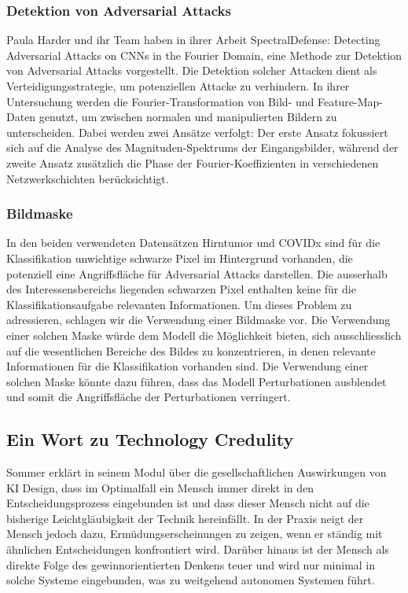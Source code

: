 \subsubsection{Detektion von Adversarial Attacks}
Paula Harder und ihr Team haben in ihrer Arbeit SpectralDefense: Detecting Adversarial Attacks on CNNs in the Fourier Domain, \cite{harder_spectraldefense_2021} eine  Methode zur Detektion von Adversarial Attacks vorgestellt. Die Detektion solcher Attacken dient als Verteidigungsstrategie, um potenziellen Attacke zu verhindern. In ihrer Untersuchung werden die Fourier-Transformation von Bild- und Feature-Map-Daten genutzt, um zwischen normalen und manipulierten Bildern zu unterscheiden. Dabei werden zwei Ansätze verfolgt: Der erste Ansatz fokussiert sich auf die Analyse des Magnituden-Spektrums der Eingangsbilder, während der zweite Ansatz zusätzlich die Phase der Fourier-Koeffizienten in verschiedenen Netzwerkschichten berücksichtigt.

\subsubsection{Bildmaske}
In den beiden verwendeten Datensätzen Hirntumor und COVIDx sind für die Klassifikation unwichtige schwarze Pixel im Hintergrund vorhanden, die potenziell eine Angriffsfläche für Adversarial Attacks darstellen. Die ausserhalb des Interessensbereichs liegenden schwarzen Pixel enthalten keine für die Klassifikationsaufgabe relevanten Informationen. Um dieses Problem zu adressieren, schlagen wir die Verwendung einer Bildmaske vor. Die Verwendung einer solchen Maske würde dem Modell die Möglichkeit bieten, sich ausschliesslich auf die wesentlichen Bereiche des Bildes zu konzentrieren, in denen relevante Informationen für die Klassifikation vorhanden sind. Die Verwendung einer solchen Maske könnte dazu führen, dass das Modell Perturbationen ausblendet und somit die Angriffsfläche der Perturbationen verringert.

\subsection{Ein Wort zu Technology Credulity}
Sommer \cite{sommer_gesellschaftliche_2024} erklärt in seinem Modul über die gesellschaftlichen Auswirkungen von KI Design, dass im Optimalfall ein Mensch immer direkt in den Entscheidungsprozess eingebunden ist und dass dieser Mensch nicht auf die bisherige Leichtgläubigkeit der Technik hereinfällt. In der Praxis neigt der Mensch jedoch dazu, Ermüdungserscheinungen zu zeigen, wenn er ständig mit ähnlichen Entscheidungen konfrontiert wird. Darüber hinaus ist der Mensch als direkte Folge des gewinnorientierten Denkens teuer und wird nur minimal in solche Systeme eingebunden, was zu weitgehend autonomen Systemen führt.

